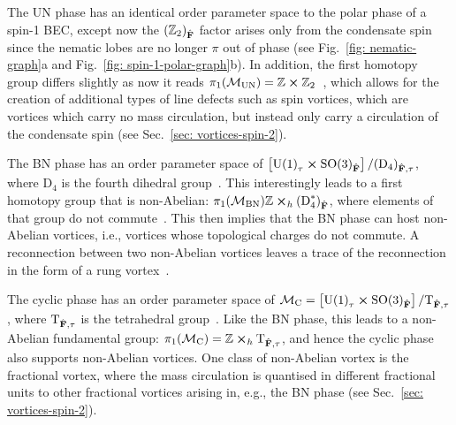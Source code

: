 The UN phase has an identical order parameter space to the polar phase of a
spin-1 BEC, except now the \({(\mathbb{Z}_2)}_{\hat{\vb{F}}}\) factor arises
only from the condensate spin since the nematic lobes are no longer \(\pi \)
out of phase (see Fig.~\ref{fig: nematic-graph}a and
Fig.~\ref{fig: spin-1-polar-graph}b).
In addition, the first homotopy group differs slightly as now it reads
\(\pi_1(\mathcal{M}_\text{UN}) = \mathbb{Z} \cross
\mathbb{Z}_2\)~\cite{Kobayashi2012}, which allows for the creation of additional
types of line defects such as spin vortices, which are vortices which carry no
mass circulation, but instead only carry a circulation of the condensate spin
(see Sec.~\ref{sec: vortices-spin-2}).

The BN phase has an order parameter space of \(\left[{\text{U}(1)}_\tau \cross
{\text{SO}(3)}_{\hat{\vb{F}}}\right] / {(\text{D}_4)}_{\hat{\vb{F}}, \tau}\),
where \(\text{D}_4\) is the fourth dihedral group~\cite{Kobayashi2012}.
This interestingly leads to a first homotopy group that is non-Abelian:
\(\pi_1(\mathcal{M}_\text{BN})\mathbb{Z} \cross_h
{(\text{D}^\ast_4)}_{\hat{\vb{F}}}\), where elements of that group do not
commute~\cite{Mermin1979}.
This then implies that the BN phase can host non-Abelian vortices, i.e.,
vortices whose topological charges do not commute.
A reconnection between two non-Abelian vortices leaves a trace of the
reconnection in the form of a rung vortex~\cite{Mermin1979}.

The cyclic phase has an order parameter space of \(\mathcal{M}_\text{C} =
\left[{\text{U}(1)}_\tau \cross {\text{SO}(3)}_{\hat{\vb{F}}}\right]
/ \text{T}_{\hat{\vb{F}}, \tau}\), where \(\text{T}_{\hat{\vb{F}}, \tau}\) is
the tetrahedral group~\cite{Kobayashi2012}.
Like the BN phase, this leads to a non-Abelian fundamental group:
\(\pi_1(\mathcal{M}_\text{C}) = \mathbb{Z} \cross_h
\text{T}_{\hat{\vb{F}}, \tau}\), and hence the cyclic phase also supports
non-Abelian vortices.
One class of non-Abelian vortex is the fractional vortex, where the mass
circulation is quantised in different fractional units to other fractional
vortices arising in, e.g., the BN phase (see Sec.~\ref{sec: vortices-spin-2}).

